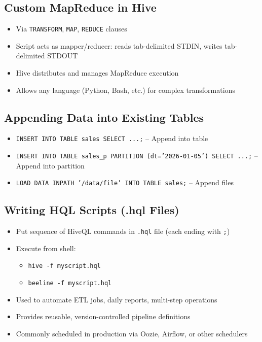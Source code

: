 \documentclass[11pt, onecolumn, a4paper]{article}
\begin{document}
\subsection{Custom MapReduce in Hive}

\begin{itemize}
  \item Via \texttt{TRANSFORM}, \texttt{MAP}, \texttt{REDUCE} clauses
  \item Script acts as mapper/reducer: reads tab-delimited STDIN, writes tab-delimited STDOUT
  \item Hive distributes and manages MapReduce execution
  \item Allows any language (Python, Bash, etc.) for complex transformations
\end{itemize}

\subsection{Appending Data into Existing Tables}

\begin{itemize}
  \item \texttt{INSERT INTO TABLE sales SELECT ...;} -- Append into table
  \item \texttt{INSERT INTO TABLE sales\_p PARTITION (dt='2026-01-05') SELECT ...;} -- Append into partition
  \item \texttt{LOAD DATA INPATH '/data/file' INTO TABLE sales;} -- Append files
\end{itemize}

\subsection{Writing HQL Scripts (.hql Files)}

\begin{itemize}
  \item Put sequence of HiveQL commands in \texttt{.hql} file (each ending with \texttt{;})
  \item Execute from shell:
  \begin{itemize}
    \item \texttt{hive -f myscript.hql}
    \item \texttt{beeline -f myscript.hql}
  \end{itemize}
  \item Used to automate ETL jobs, daily reports, multi-step operations
  \item Provides reusable, version-controlled pipeline definitions
  \item Commonly scheduled in production via Oozie, Airflow, or other schedulers
\end{itemize}
\end{document}

